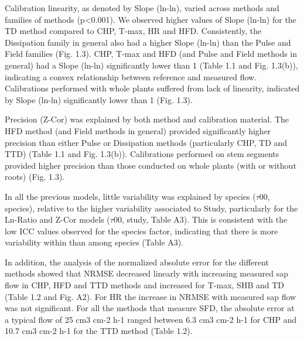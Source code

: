 \documentclass[11pt,twoside]{reedthesis}
\begin{document}
Calibration linearity, as denoted by Slope (ln-ln), varied across
methods and families of methods (p\textless{}0.001). We observed higher
values of Slope (ln-ln) for the TD method compared to CHP, T-max, HR and
HFD. Consistently, the Dissipation family in general also had a higher
Slope (ln-ln) than the Pulse and Field families (Fig. 1.3). CHP, T-max
and HFD (and Pulse and Field methods in general) had a Slope (ln-ln)
significantly lower than 1 (Table 1.1 and Fig. 1.3(b)), indicating a
convex relationship between reference and measured flow. Calibrations
performed with whole plants suffered from lack of linearity, indicated
by Slope (ln-ln) significantly lower than 1 (Fig. 1.3).\par

Precision (Z-Cor) was explained by both method and calibration material.
The HFD method (and Field methods in general) provided significantly
higher precision than either Pulse or Dissipation methods (particularly
CHP, TD and TTD) (Table 1.1 and Fig. 1.3(b)). Calibrations performed on
stem segments provided higher precision than those conducted on whole
plants (with or without roots) (Fig. 1.3).\par

In all the previous models, little variability was explained by species
(\(\tau 00\), species), relative to the higher variability associated to
Study, particularly for the Ln-Ratio and Z-Cor models (\(\tau 00\),
study, Table A3). This is consistent with the low ICC values observed
for the species factor, indicating that there is more variability within
than among species (Table A3).\par

In addition, the analysis of the normalized absolute error for the
different methods showed that NRMSE decreased linearly with increasing
measured sap flow in CHP, HFD and TTD methods and increased for T-max,
SHB and TD (Table 1.2 and Fig. A2). For HR the increase in NRMSE with
measured sap flow was not significant. For all the methods that measure
SFD, the absolute error at a typical flow of 25 cm3 cm-2 h-1 ranged
between 6.3 cm3 cm-2 h-1 for CHP and 10.7 cm3 cm-2 h-1 for the TTD
method (Table 1.2).\par
\end{document}
